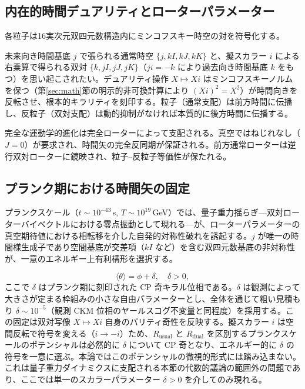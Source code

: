\documentclass[dvipdfmx,a4paper]{article}
\begin{document}
\subsection{内在的時間デュアリティとローターパラメーター}

各粒子は16実次元双四元数構造内にミンコフスキー時空の対を符号化する。

未来向き時間基底 $j$ で張られる通常時空 $\{j, kI, kJ, kK\}$ と、擬スカラー $i$ による右乗算で得られる双対 $\{k, jI, jJ, jK\}$（$j i = -k$ により過去向き時間基底 $k$ をもつ）を思い起こされたい。デュアリティ操作 $X \mapsto X i$ はミンコフスキーノルムを保つ（第\ref{sec:math}節の明示的非可換計算により $(X i)^2 = X^2$）が時間向きを反転させ、根本的キラリティを刻印する。粒子（通常支配）は前方時間に伝播し、反粒子（双対支配）は動的抑制がなければ本質的に後方時間に伝播する。

完全な運動学的進化は完全ローターによって支配される。真空ではねじれなし（$J=0$）が要求され、時間矢の完全反同期が保証される。前方通常ローターは逆行双対ローターに鏡映され、粒子--反粒子等価性が保たれる。

\subsection{プランク期における時間矢の固定}

プランクスケール（$t \sim 10^{-43}$\,s, $T \sim 10^{19}$\,GeV）では、量子重力揺らぎ---双対ローターバイベクトルにおける零点振動として現れる---が、ローターパラメーターの真空期待値における相転移を介した自発的対称性破れを誘起する。$j$ が唯一の時間様生成子であり空間基底が交差項（$kI$ など）を含む双四元数基底の非対称性が、一意のエネルギー上有利構形を選択する。

\[
\langle \theta \rangle = \phi + \delta, \quad \delta > 0,
\]
ここで $\delta$ はプランク期に刻印された CP 奇キラル位相である。$\delta$ は観測によって大きさが定まる枠組みの小さな自由パラメーターとし、全体を通じて粗い見積もり $\delta \sim 10^{-5}$（観測 CKM 位相のヤールスコグ不変量と同程度）を採用する。この固定は双対写像 $X \mapsto X i$ 自身のパリティ奇性を反映する。擬スカラー $i$ は空間反転で符号を変える（$i \to -i$）ため、$R_\text{usual}$ と $R_\text{dual}$ を区別するプランクスケールのポテンシャルは必然的に $\delta$ について CP 奇となり、エネルギー的に $\delta$ の符号を一意に選ぶ。本論ではこのポテンシャルの微視的形式には踏み込まない。これは量子重力ダイナミクスに支配される本節の代数的議論の範囲外の問題であり、ここでは単一のスカラーパラメーター $\delta > 0$ を介してのみ現れる。
\end{document}
